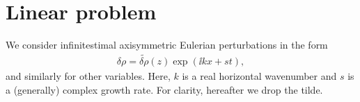 \section{Linear problem}\label{linear}
We consider infinitestimal axisymmetric Eulerian perturbations in the
form \begin{align}
  \delta \rho= \widetilde{\delta \rho}(z)\exp{\left(\ii kx +
    s t\right)},  
\end{align}
and similarly for other variables. Here, $k$ 
is a real horizontal wavenumber and $s$ is a (generally) complex
growth rate. 
For clarity, hereafter we drop the tilde.  

